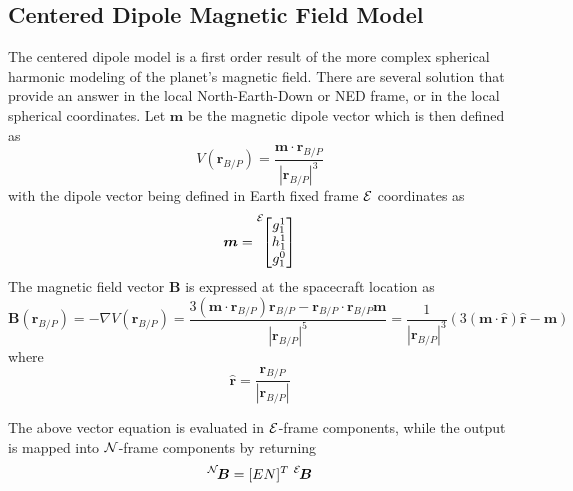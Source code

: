 \subsection{Centered Dipole Magnetic Field Model}
The centered dipole model is a first order result of the more complex spherical harmonic modeling of the planet's magnetic field.\cite{Markley:2014lj}  There are several solution that provide an answer in the local North-Earth-Down or NED frame,\cite{Grifin:2005hx} or in the local  spherical coordinates.  Let  $\bm m$ be the magnetic dipole vector which is then defined as\cite{Markley:2014lj}
\begin{equation}
	V(\bm r_{B/P}) = \frac{\bm m \cdot \bm r_{B/P}}{|\bm r_{B/P}|^{3}}
\end{equation}
with the dipole vector being defined in Earth fixed frame $\cal E$ coordinates as 
\begin{equation}
	\bm m = \leftexp{E}{\begin{bmatrix}
		g_{1}^{1} \\ h_{1}^{1} \\ g_{1}^{0}
	\end{bmatrix}}
\end{equation}
The magnetic field vector $\bm B$ is  expressed at the spacecraft location as
\begin{equation}
	\bm B(\bm r_{B/P}) = - \nabla V(\bm r_{B/P}) = \frac{3 (\bm m \cdot \bm r_{B/P}) \bm r_{B/P} - \bm r_{B/P} \cdot \bm r_{B/P} \bm m}{|\bm r_{B/P}|^{5}}
	= \frac{1}{|\bm r_{B/P}|^{3}} \left ( 3 (\bm m \cdot \hat{\bm r}) \hat{\bm r} - \bm m \right)
\end{equation}
where 
\begin{equation}
	\hat{\bm r} = \frac{\bm r_{B/P}}{|\bm r_{B/P}|}
\end{equation}

The above vector equation is evaluated in $\cal E$-frame components, while the output is mapped into $\cal N$-frame components by returning
\begin{equation}
	\leftexp{N}{\bm B} = [EN]^{T} \ \leftexp{E}{\bm B}
\end{equation}

